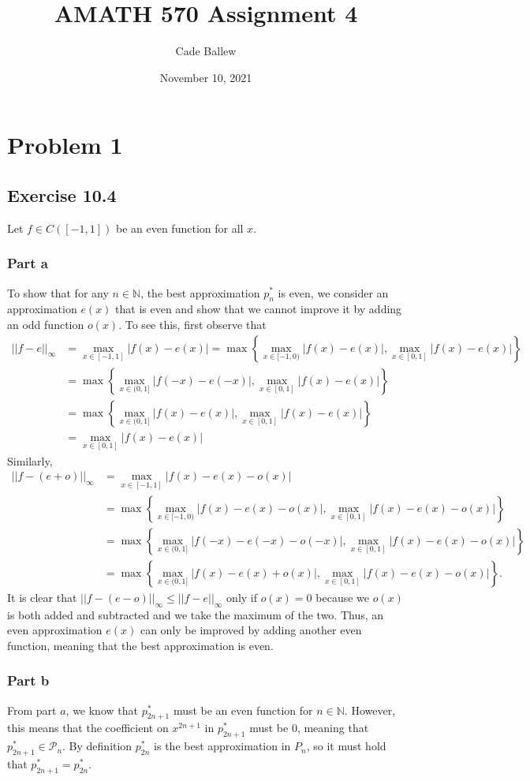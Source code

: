 \documentclass{article}
\title{AMATH 570 Assignment 4}
\author{Cade Ballew}
\date{November 10, 2021}
\begin{document}
\maketitle

\section{Problem 1}
\subsection{Exercise 10.4}
Let $f\in C([-1, 1])$ be an
even function for all $x$.
\subsubsection{Part a}
To show that for any $n\in\mathbb{N}$, the best approximation $p_n^*$ is even, we consider an approximation $e(x)$ that is even and show that we cannot improve it by adding an odd function $o(x)$. To see this, first observe that 
\begin{align*}
||f-e||_\infty&=\max_{x\in[-1,1]}|f(x)-e(x)|=\max\left\{\max_{x\in[-1,0)}|f(x)-e(x)|,\max_{x\in[0,1]}|f(x)-e(x)|\right\}\\&=
\max\left\{\max_{x\in(0,1]}|f(-x)-e(-x)|,\max_{x\in[0,1]}|f(x)-e(x)|\right\}\\&=\max\left\{\max_{x\in(0,1]}|f(x)-e(x)|,\max_{x\in[0,1]}|f(x)-e(x)|\right\}\\&=
\max_{x\in[0,1]}|f(x)-e(x)|
\end{align*}
Similarly, 
\begin{align*}
||f-(e+o)||_\infty&=\max_{x\in[-1,1]}|f(x)-e(x)-o(x)|\\&=
\max\left\{\max_{x\in[-1,0)}|f(x)-e(x)-o(x)|,\max_{x\in[0,1]}|f(x)-e(x)-o(x)|\right\}\\&=
\max\left\{\max_{x\in(0,1]}|f(-x)-e(-x)-o(-x)|,\max_{x\in[0,1]}|f(x)-e(x)-o(x)|\right\}\\&=\max\left\{\max_{x\in(0,1]}|f(x)-e(x)+o(x)|,\max_{x\in[0,1]}|f(x)-e(x)-o(x)|\right\}.
\end{align*}
It is clear that $||f-(e-o)||_\infty\leq||f-e||_\infty$ only if $o(x)=0$ because we $o(x)$ is both added and subtracted and we take the maximum of the two. Thus, an even approximation $e(x)$ can only be improved by adding another even function, meaning that the best approximation is even. 

\subsubsection{Part b}
From part $a$, we know that $p_{2n+1}^*$ must be an even function for $n\in\mathbb{N}$. However, this means that the coefficient on $x^{2n+1}$ in $p_{2n+1}^*$ must be 0, meaning that $p_{2n+1}^*\in\mathcal{P}_n$. By definition $p_{2n}^*$ is the best approximation in ${P}_n$, so it must hold that $p_{2n+1}^*=p_{2n}^*$.
\end{document}
